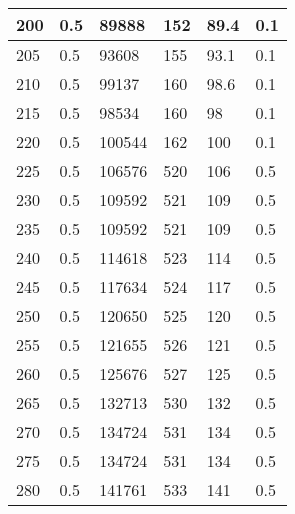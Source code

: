 \begin{center}
\begin{longtable}{|l|l|l|l|l|l|}
200    & 0.5     & 89888            & 152          & 89.4           & 0.1        \\ \hline
205    & 0.5     & 93608            & 155          & 93.1           & 0.1        \\ \hline
210    & 0.5     & 99137            & 160          & 98.6           & 0.1        \\ \hline
215    & 0.5     & 98534            & 160          & 98             & 0.1        \\ \hline
220    & 0.5     & 100544           & 162          & 100            & 0.1        \\ \hline
225    & 0.5     & 106576           & 520          & 106            & 0.5        \\ \hline
230    & 0.5     & 109592           & 521          & 109            & 0.5        \\ \hline
235    & 0.5     & 109592           & 521          & 109            & 0.5        \\ \hline
240    & 0.5     & 114618           & 523          & 114            & 0.5        \\ \hline
245    & 0.5     & 117634           & 524          & 117            & 0.5        \\ \hline
250    & 0.5     & 120650           & 525          & 120            & 0.5        \\ \hline
255    & 0.5     & 121655           & 526          & 121            & 0.5        \\ \hline
260    & 0.5     & 125676           & 527          & 125            & 0.5        \\ \hline
265    & 0.5     & 132713           & 530          & 132            & 0.5        \\ \hline
270    & 0.5     & 134724           & 531          & 134            & 0.5        \\ \hline
275    & 0.5     & 134724           & 531          & 134            & 0.5        \\ \hline
280    & 0.5     & 141761           & 533          & 141            & 0.5        \\ \hline

\end{longtable}
\end{center}